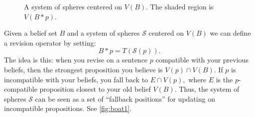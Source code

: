 \begin{figure}[ht]
  \centering
    \caption{A system of spheres centered on $V(B)$. The shaded region is $V(B*p)$. }
  \label{fig:boat1}
\end{figure}
Given a belief set $B$ and a system of spheres $\mathcal{S}$ centered on $V(B)$
we can define a revision operator by setting: $$B*p = T(\mathcal{S}(p)).$$ The
idea is this: when you revise on a sentence $p$ compatible with your previous
beliefs, then the strongest proposition you believe is $V(p) \cap V(B).$ If $p$
is incompatible with your beliefs, you fall back to $E\cap V(p),$ where $E$ is
the $p$-compatible proposition closest to your old belief $V(B)$. Thus, the
system of spheres $\mathcal{S}$ can be seen as a set of ``fallback positions''
for updating on incompatible propositions. See \autoref{fig:boat1}.

